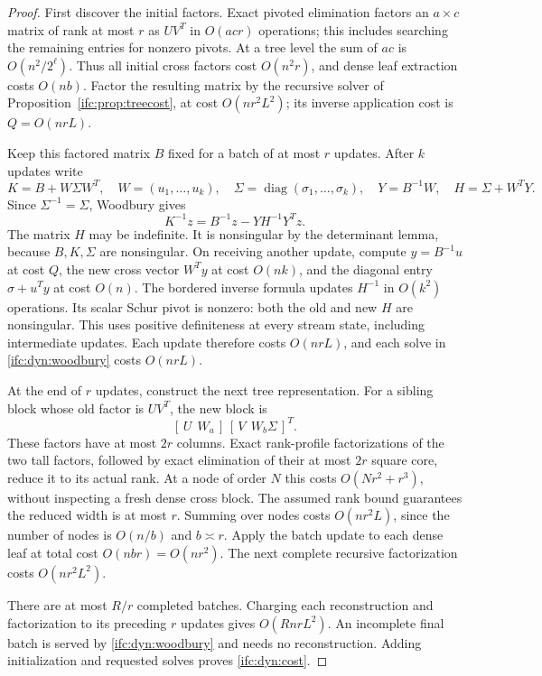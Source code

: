 \documentclass[11pt]{amsart}
\theoremstyle{definition}\newtheorem{definition}[theorem]{Definition}
\theoremstyle{remark}\newtheorem{remark}[theorem]{Remark}
\numberwithin{equation}{section}
\begin{document}
\begin{proof}
First discover the initial factors.  Exact pivoted elimination factors
an $a\times c$ matrix of rank at most $r$ as $UV^T$ in $O(acr)$
operations; this includes searching the remaining entries for nonzero
pivots.  At a tree level the sum of $ac$ is $O(n^2/2^\ell)$.
Thus all initial cross factors cost $O(n^2r)$, and dense leaf extraction
costs $O(nb)$.  Factor the resulting matrix by the recursive solver of
Proposition~\ref{ifc:prop:treecost}, at cost $O(nr^2L^2)$; its inverse
application cost is $Q=O(nrL)$.

Keep this factored matrix $B$ fixed for a batch of at most $r$ updates.
After $k$ updates write
\[
 K=B+W\Sigma W^T,\quad
 W=(u_1,\ldots,u_k),\quad
 \Sigma=\operatorname{diag}(\sigma_1,\ldots,\sigma_k),\quad
 Y=B^{-1}W,\quad H=\Sigma+W^TY.
\]
Since $\Sigma^{-1}=\Sigma$, Woodbury gives
\begin{equation}\label{ifc:dyn:woodbury}
 K^{-1}z=B^{-1}z-YH^{-1}Y^Tz.
\end{equation}
The matrix $H$ may be indefinite.  It is nonsingular by the determinant
lemma, because $B,K,\Sigma$ are nonsingular.  On receiving another
update, compute $y=B^{-1}u$ at cost $Q$, the new cross vector $W^Ty$
at cost $O(nk)$, and the diagonal entry $\sigma+u^Ty$ at cost $O(n)$.
The bordered inverse formula updates $H^{-1}$ in $O(k^2)$ operations.
Its scalar Schur pivot is nonzero: both the old and new $H$ are
nonsingular.  This uses positive definiteness at every stream state,
including intermediate updates.  Each update therefore costs $O(nrL)$,
and each solve in \eqref{ifc:dyn:woodbury} costs $O(nrL)$.

At the end of $r$ updates, construct the next tree representation.
For a sibling block whose old factor is $UV^T$, the new block is
\[
 [\,U\ \ W_a\,]\,[\,V\ \ W_b\Sigma\,]^T.
\]
These factors have at most $2r$ columns.  Exact rank-profile factorizations
of the two tall factors, followed by exact elimination of their at most
$2r$ square core, reduce it to its actual rank.  At a node of order
$N$ this costs $O(Nr^2+r^3)$, without inspecting a fresh dense cross
block.  The assumed rank bound guarantees the reduced width is at most
$r$.  Summing over nodes costs $O(nr^2L)$, since the number of nodes is
$O(n/b)$ and $b\asymp r$.  Apply the batch update to each dense leaf
at total cost $O(nb r)=O(nr^2)$.  The next complete recursive
factorization costs $O(nr^2L^2)$.

There are at most $R/r$ completed batches.  Charging each reconstruction
and factorization to its preceding $r$ updates gives $O(RnrL^2)$.
An incomplete final batch is served by \eqref{ifc:dyn:woodbury} and needs
no reconstruction.  Adding initialization and requested solves proves
\eqref{ifc:dyn:cost}.
\end{proof}
\end{document}
